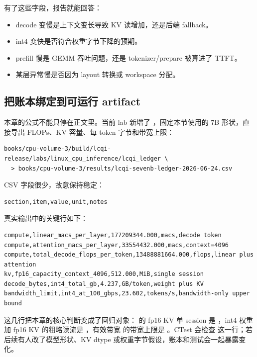 有了这些字段，报告就能回答：

\begin{itemize}
  \item decode 变慢是上下文变长导致 KV 读增加，还是后端 fallback。
  \item int4 变快是否符合权重字节下降的预期。
  \item prefill 慢是 GEMM 吞吐问题，还是 tokenizer/prepare 被算进了 TTFT。
  \item 某层异常慢是否因为 layout 转换或 workspace 分配。
\end{itemize}

\subsection{把账本绑定到可运行 artifact}

本章的公式不能只停在正文里。当前 lab 新增了 ，固定本节使用的 7B 形状，直接导出 FLOPs、KV 容量、每 token 字节和带宽上限：

\begin{lstlisting}[numbers=none,caption={7B ledger 复现命令}]
books/cpu-volume-3/build/lcqi-release/labs/linux_cpu_inference/lcqi_ledger \
  > books/cpu-volume-3/results/lcqi-sevenb-ledger-2026-06-24.csv
\end{lstlisting}

CSV 字段很少，故意保持稳定：

\begin{lstlisting}[numbers=none,caption={lcqi ledger CSV 字段}]
section,item,value,unit,notes
\end{lstlisting}

真实输出中的关键行如下：

\begin{lstlisting}[numbers=none,caption={lcqi ledger CSV 摘要}]
compute,linear_macs_per_layer,177209344.000,macs,decode token
compute,attention_macs_per_layer,33554432.000,macs,context=4096
compute,total_decode_flops_per_token,13488881664.000,flops,linear plus attention
kv,fp16_capacity_context_4096,512.000,MiB,single session
decode_bytes,int4_total_gb,4.237,GB/token,weight plus KV
bandwidth_limit,int4_at_100_gbps,23.602,tokens/s,bandwidth-only upper bound
\end{lstlisting}

这几行把本章的核心判断变成了回归对象： 的 fp16 KV 单 session 是 ，int4 权重加 fp16 KV 的粗略读流是 ，有效带宽  的带宽上限是 。CTest 会检查  这一行；若后续有人改了模型形状、KV dtype 或权重字节假设，账本和测试会一起暴露变化。

